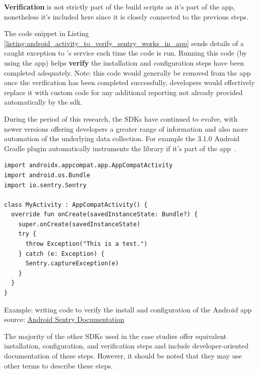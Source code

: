 \textbf{Verification} is not strictly part of the build scripts as it's part of the app, nonetheless it's included here since it is closely connected to the previous steps.

The code snippet in Listing \ref{listing:android_activity_to_verify_sentry_works_in_app} sends details of a caught exception to 's service each time the code is run. Running this code (by using the app) helps \textbf{verify} the installation and configuration steps have been completed adequately. Note: this code would generally be removed from the app once the verification has been completed successfully, developers would effectively replace it with custom code for any additional reporting not already provided automatically by the \Gls{sdk}. %

During the period of this research, the SDKs have continued to evolve, with newer versions offering developers a greater range of information and also more automation of the underlying data collection.  For example the  3.1.0 Android Gradle plugin automatically instruments the  library if it's part of the app~.


\begin{listing}
\begin{verbatim}
import androidx.appcompat.app.AppCompatActivity
import android.os.Bundle
import io.sentry.Sentry

class MyActivity : AppCompatActivity() {
  override fun onCreate(savedInstanceState: Bundle?) {
    super.onCreate(savedInstanceState)
    try {
      throw Exception("This is a test.")
    } catch (e: Exception) {
      Sentry.captureException(e)
    }
  }
}
\end{verbatim}
\caption[Writing code to verify the install and configuration of the Android app]{Example: writing code to verify the install and configuration of the Android app\\ source: \href{https://docs.sentry.io/platforms/android/}{Android Sentry Documentation}}
\label{listing:android_activity_to_verify_sentry_works_in_app}
\end{listing}

The majority of the other SDKs used in the case studies offer equivalent installation, configuration, and verification steps and include developer-oriented documentation of these steps. However, it should be noted that they may use other terms to describe these steps.

